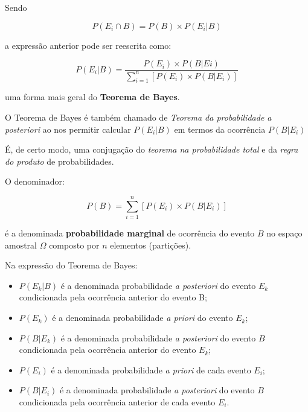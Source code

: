 \documentclass[
]{book}
\providecommand{\tightlist}{%
  \setlength{\itemsep}{0pt}\setlength{\parskip}{0pt}}
\begin{document}
Sendo

\hfill\break

\[
P(E_{i} \cap B) = P(B) \times P(E_{i}|B) 
\]

\hfill\break

a expressão anterior pode ser reescrita como:

\hfill\break

\[
P(E_{i}|B) = \frac{ P(E_{i}) \times P(B|E{i})   }{  \sum _{i=1}^{n}\left[P\left({E}_{i}\right)\times P\left(B|{E}_{i}\right)\right]  }
\]

uma forma mais geral do \textbf{Teorema de Bayes}.

\hfill\break

O Teorema de Bayes é também chamado de \emph{Teorema da probabilidade a posteriori} ao nos permitir calcular \(P(E_{i}|B)\) em termos da ocorrência \(P(B|E_{i})\)

\hfill\break

É, de certo modo, uma conjugação do \emph{teorema na probabilidade total} e da \emph{regra do produto} de probabilidades.

\hfill\break

O denominador:

\hfill\break

\[
P(B)=  \sum _{i=1}^{n}\left[P\left({E}_{i}\right)\times P\left(B|{E}_{i}\right)\right]
\]

\hfill\break

é a denominada \textbf{probabilidade marginal} de ocorrência do evento \(B\) no espaço amostral \(\Omega\) composto por \(n\) elementos (partições).

\hfill\break

Na expressão do Teorema de Bayes:

\hfill\break

\begin{itemize}
\tightlist
\item
  \(P(E_{k}|B)\) é a denominada probabilidade \emph{a posteriori} do evento \(E_{k}\) condicionada pela ocorrência anterior do evento B;\\
\item
  \(P(E_{k})\) é a denominada probabilidade \emph{a priori} do evento \(E_{k}\);\\
\item
  \(P(B|E_{k})\) é a denominada probabilidade \emph{a posteriori} do evento \(B\) condicionada pela ocorrência anterior do evento \(E_{k}\);\\
\item
  \(P(E_{i})\) é a denominada probabilidade \emph{a priori} de cada evento \(E_{i}\);\\
\item
  \(P(B|E_{i})\) é a denominada probabilidade \emph{a posteriori} do evento \(B\) condicionada pela ocorrência anterior de cada evento \(E_{i}\).
\end{itemize}
\end{document}
